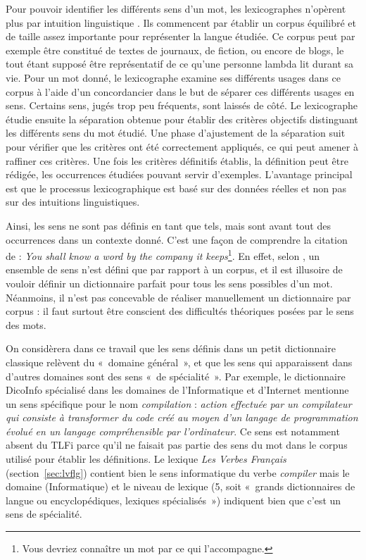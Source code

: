 Pour pouvoir identifier les différents sens d'un mot, les lexicographes
n'opèrent plus par intuition linguistique \citep{kilgarriff1997don}. Ils
commencent par établir un corpus équilibré et de taille assez importante pour
représenter la langue étudiée. Ce corpus peut par exemple être constitué de
textes de journaux, de fiction, ou encore de blogs, le tout étant supposé être
représentatif de ce qu'une personne lambda lit durant sa vie. Pour un mot
donné, le lexicographe examine ses différents usages dans ce corpus à l'aide
d'un concordancier dans le but de séparer ces différents usages en sens.
Certains sens, jugés trop peu fréquents, sont laissés de côté. Le lexicographe
étudie ensuite la séparation obtenue pour établir des critères objectifs
distinguant les différents sens du mot étudié. Une phase d'ajustement de la
séparation suit pour vérifier que les critères ont été correctement appliqués,
ce qui peut amener à raffiner ces critères. Une fois les critères définitifs
établis, la définition peut être rédigée, les occurrences étudiées pouvant
servir d'exemples. L'avantage principal est que le processus lexicographique
est basé sur des données réelles et non pas sur des intuitions linguistiques.

Ainsi, les sens ne sont pas définis en tant que tels, mais sont avant tout des
occurrences dans un contexte donné. C'est une façon de comprendre la citation
de \citep{firth1957synopsys} : \textit{You shall know a word by the company it
keeps}\footnote{Vous devriez connaître un mot par ce qui l'accompagne.}. En
effet, selon \citep{kilgarriff1997don}, un ensemble de sens n'est défini que
par rapport à un corpus, et il est illusoire de vouloir définir un dictionnaire
parfait pour tous les sens possibles d'un mot. Néanmoins, il n'est pas
concevable de réaliser manuellement un dictionnaire par corpus : il faut
surtout être conscient des difficultés théoriques posées par le sens des mots.

On considèrera dans ce travail que les sens définis dans un petit dictionnaire
classique relèvent du «~domaine général~», et que les sens qui apparaissent
dans d'autres domaines sont des sens «~de spécialité~». Par exemple, le
dictionnaire DicoInfo \citep{corpusolst} spécialisé dans les domaines de
l'Informatique et d'Internet mentionne un sens spécifique pour le nom
\textit{compilation} : \textit{action effectuée par un compilateur qui consiste
    à transformer du code créé au moyen d'un langage de programmation évolué en
un langage compréhensible par l'ordinateur}. Ce sens est notamment absent du
TLFi \citep{TLFi} parce qu'il ne faisait pas partie des sens du mot dans le
corpus utilisé pour établir les définitions. Le lexique \textit{Les Verbes
Français} (section~\ref{sec:lvflg}) contient bien le sens informatique du verbe
\textit{compiler} mais le domaine (Informatique) et le niveau de lexique (5,
soit «~grands dictionnaires de langue ou encyclopédiques, lexiques
spécialisés~») indiquent bien que c'est un sens de spécialité.

